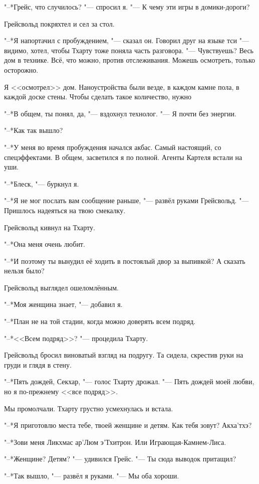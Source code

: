 \documentclass[a4paper,10pt]{book}
\newcommand{\ldotst}{\so{...}\xspace}
\begin{document}
"--*Грейс, что случилось? "--- спросил я. "--- К чему эти игры в домики-дороги?

Грейсвольд покряхтел и сел за стол.

"--*Я напортачил с пробуждением, "--- сказал он. Говорил друг на языке тси "--- 
видимо, хотел, чтобы Тхарту тоже поняла
часть разговора. "--- Чувствуешь? 
Весь дом в технике. Всё, что можно, против отслеживания. Можешь осмотреть, 
только осторожно.

Я <<осмотрел>> дом. Наноустройства были везде, в каждом камне пола, в каждой 
доске стены. Чтобы сделать такое количество, нужно\ldotst

"--*В общем, ты понял, да, "--- вздохнул технолог. "--- Я почти без энергии.

"--*Как так вышло?

"--*У меня во время пробуждения начался акбас. Самый настоящий, со 
спецэффектами. В общем, засветился я по полной. Агенты 
Картеля встали на уши.

"--*Блеск, "--- буркнул я.

"--*Я не мог послать вам сообщение раньше, "--- развёл руками Грейсвольд. "--- 
Пришлось 
надеяться на твою смекалку.

Грейсвольд кивнул на Тхарту.

"--*Она меня очень любит.

"--*И поэтому ты вынудил её ходить в постоялый двор за выпивкой? А сказать 
нельзя было?

Грейсвольд выглядел ошеломлённым.

"--*Моя женщина знает, "--- добавил я.

"--*План не на той стадии, когда можно доверять всем подряд.

"--*<<Всем подряд>>? "--- процедила Тхарту.

Грейсвольд бросил виноватый взгляд на подругу. Та сидела, скрестив руки на 
груди 
и глядя в стену.

"--*Пять дождей, Секхар, "--- голос Тхарту дрожал. "--- Пять дождей моей любви, 
но я по-прежнему <<все подряд>>.

Мы промолчали. Тхарту грустно усмехнулась и встала.

"--*Я приготовлю места тебе, твоей женщине и детям. Как тебя зовут? Акха'тхэ?

"--*Зови меня Ликхмас ар'Люм э'Тхитрон. Или Играющая-Камнем-Лиса.

"--*Женщине? Детям? "--- удивился Грейс. "--- Ты сюда выводок притащил?

"--*Так вышло, "--- развёл я руками. "--- Мы оба хороши.
\end{document}
